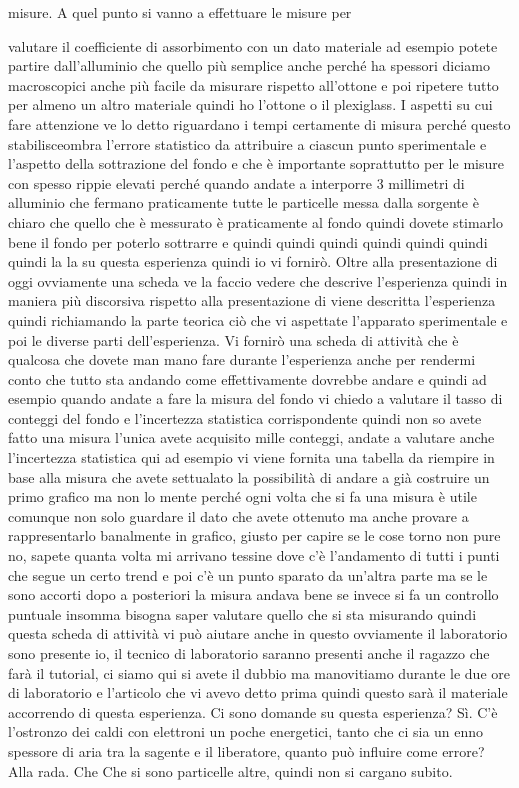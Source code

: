 {misure. A quel punto si vanno a effettuare le misure per 

valutare il coefficiente di assorbimento con un dato materiale ad esempio potete partire dall'alluminio che quello più semplice anche perché ha spessori diciamo macroscopici anche più facile da misurare rispetto all'ottone e poi ripetere tutto per almeno un altro materiale quindi ho l'ottone o il plexiglass. I aspetti su cui fare attenzione ve lo detto riguardano i tempi certamente di misura perché questo stabilisceombra l'errore statistico da attribuire a ciascun punto sperimentale e l'aspetto della sottrazione del fondo e che è importante soprattutto per le misure con spesso rippie elevati perché quando andate a interporre 3 millimetri di alluminio che fermano praticamente tutte le particelle messa dalla sorgente è chiaro che quello che è messurato è praticamente al fondo quindi dovete stimarlo bene il fondo per poterlo sottrarre e quindi quindi quindi quindi quindi quindi quindi la la su questa esperienza quindi io vi fornirò. Oltre alla presentazione di oggi ovviamente una scheda ve la faccio vedere che descrive l'esperienza quindi in maniera più discorsiva rispetto alla presentazione di viene descritta l'esperienza quindi richiamando la parte teorica ciò che vi aspettate l'apparato sperimentale e poi le diverse parti dell'esperienza. Vi fornirò una scheda di attività che è qualcosa che dovete man mano fare durante l'esperienza anche per rendermi conto che tutto sta andando come effettivamente dovrebbe andare e quindi ad esempio quando andate a fare la misura del fondo vi chiedo a valutare il tasso di conteggi del fondo e l'incertezza statistica corrispondente quindi non so avete fatto una misura l'unica avete acquisito mille conteggi, andate a valutare anche l'incertezza statistica qui ad esempio vi viene fornita una tabella da riempire in base alla misura che avete settualato la possibilità di andare a già costruire un primo grafico ma non lo mente perché ogni volta che si fa una misura è utile comunque non solo guardare il dato che avete ottenuto ma anche provare a rappresentarlo banalmente in grafico, giusto per capire se le cose torno non pure no, sapete quanta volta mi arrivano tessine dove c'è l'andamento di tutti i punti che segue un certo trend e poi c'è un punto sparato da un'altra parte ma se le sono accorti dopo a posteriori la misura andava bene se invece si fa un controllo puntuale insomma bisogna saper valutare quello che si sta misurando quindi questa scheda di attività vi può aiutare anche in questo ovviamente il laboratorio sono presente io, il tecnico di laboratorio saranno presenti anche il ragazzo che farà il tutorial, ci siamo qui si avete il dubbio ma manovitiamo durante le due ore di laboratorio e l'articolo che vi avevo detto prima quindi questo sarà il materiale accorrendo di questa esperienza. Ci sono domande su questa esperienza? Sì. C'è l'ostronzo dei caldi con elettroni un poche energetici, tanto che ci sia un enno spessore di aria tra la sagente e il liberatore, quanto può influire come errore? Alla rada. Che Che si sono particelle altre, quindi non si cargano subito.

}
